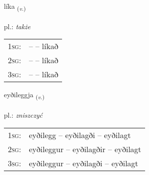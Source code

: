 \documentclass[frontgrid, backgrid]{flacards}\usepackage[]{graphicx}\usepackage[]{xcolor}
\begin{document}
\renewcommand{\flhead}{\vskip5pt \fboxsep=0pt {\small\bfseries\footnotesize Sagnorð | czasownik}}
\renewcommand{\fcfoot}{\vskip5pt \fboxsep=0pt \hspace{2pt}{\small\bfseries\footnotesize 3K}}

\renewcommand{\blhead}{\vskip5pt {\small\bfseries\footnotesize Sagnorð | czasownik }}
\renewcommand{\bcfoot}{\vskip5pt \hspace{2pt}{\small\bfseries\footnotesize 3K}}


{líka \small{\textsubscript{(\textit{v.})}} \\[1ex] %
\textphonetic{[liːka]} \\
pl.: \emph{także} \\  [2ex]
\renewcommand*{\arraystretch}{0.8}
\begin{tabular}{p{1cm}l}
\textsc{1sg}: &  --  -- líkað \\ 
\textsc{2sg}: &  --  -- líkað \\ 
\textsc{3sg}: &  --  -- líkað \\ 
\end{tabular}
}

\renewcommand{\flhead}{\vskip5pt \fboxsep=0pt {\small\bfseries\footnotesize Sagnorð | czasownik}}
\renewcommand{\fcfoot}{\vskip5pt \fboxsep=0pt \hspace{2pt}{\small\bfseries\footnotesize 3K}}

\renewcommand{\blhead}{\vskip5pt {\small\bfseries\footnotesize Sagnorð | czasownik }}
\renewcommand{\bcfoot}{\vskip5pt \hspace{2pt}{\small\bfseries\footnotesize 3K}}


{eyðileggja \small{\textsubscript{(\textit{v.})}} \\[1ex] %
\textphonetic{[eiːðɪlɛca]} \\
pl.: \emph{zniszczyć} \\  [2ex]
\renewcommand*{\arraystretch}{0.8}
\begin{tabular}{p{1cm}l}
\textsc{1sg}: & eyðilegg -- eyðilagði -- eyðilagt \\ 
\textsc{2sg}: & eyðileggur -- eyðilagðir -- eyðilagt \\ 
\textsc{3sg}: & eyðileggur -- eyðilagði -- eyðilagt \\ 
\end{tabular}
}
\end{document}
